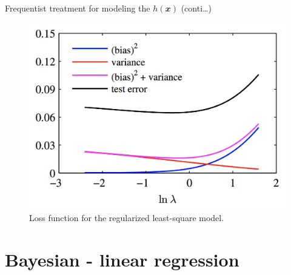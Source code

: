 \documentclass{bredelebeamer}
\begin{document}
\begin{frame}{Frequentist treatment for modeling the $h(\mathbfit{x})$ (conti\ldots)}
  \begin{figure}
  \centering
  \includegraphics[scale=0.35]{bias_variance_tradeoff.png}
  \caption{
    Loss function for the regularized least-square model.
  }
  \end{figure}
\end{frame}

\section{Bayesian - linear regression}
\end{document}
